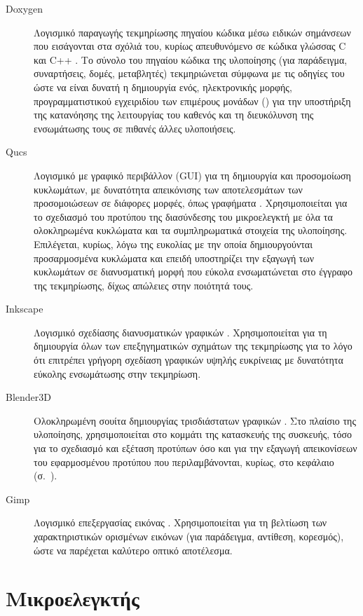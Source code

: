 \begin{description}
\item[Doxygen]
Λογισμικό παραγωγής τεκμηρίωσης πηγαίου κώδικα μέσω ειδικών σημάνσεων που
εισάγονται στα σχόλιά του, κυρίως απευθυνόμενο σε κώδικα γλώσσας C και C++
\parencite{doxygen}. Το σύνολο του πηγαίου κώδικα της υλοποίησης (για
παράδειγμα, συναρτήσεις, δομές, μεταβλητές) τεκμηριώνεται σύμφωνα με τις οδηγίες
του  ώστε να είναι δυνατή η δημιουργία ενός, ηλεκτρονικής μορφής,
προγραμματιστικού εγχειριδίου των επιμέρους μονάδων () για την
υποστήριξη της κατανόησης της λειτουργίας του καθενός και τη διευκόλυνση της
ενσωμάτωσης τους σε πιθανές άλλες υλοποιήσεις.

\item[Qucs]
Λογισμικό με γραφικό περιβάλλον (GUI) για τη δημιουργία και προσομοίωση
κυκλωμάτων, με δυνατότητα απεικόνισης των αποτελεσμάτων των προσομοιώσεων σε
διάφορες μορφές, όπως γραφήματα \parencite{qucs}.
Χρησιμοποιείται για το σχεδιασμό του προτύπου της διασύνδεσης του μικροελεγκτή
με όλα τα ολοκληρωμένα κυκλώματα και τα συμπληρωματικά στοιχεία της υλοποίησης.
Επιλέγεται, κυρίως, λόγω της ευκολίας με την οποία δημιουργούνται προσαρμοσμένα
κυκλώματα και επειδή υποστηρίζει την εξαγωγή των κυκλωμάτων σε διανυσματική
μορφή που εύκολα ενσωματώνεται στο έγγραφο της τεκμηρίωσης, δίχως απώλειες στην
ποιότητά τους.

\item[Inkscape]
Λογισμικό σχεδίασης διανυσματικών γραφικών \parencite{inkscape}. Χρησιμοποιείται
για τη δημιουργία όλων των επεξηγηματικών σχημάτων της τεκμηρίωσης για το λόγο
ότι επιτρέπει γρήγορη σχεδίαση γραφικών υψηλής ευκρίνειας με δυνατότητα εύκολης
ενσωμάτωσης στην τεκμηρίωση.

\item[Blender3D]
Ολοκληρωμένη σουίτα δημιουργίας τρισδιάστατων γραφικών \parencite{blender3d}.
Στο πλαίσιο της υλοποίησης, χρησιμοποιείται στο κομμάτι της κατασκευής της
συσκευής, τόσο για το σχεδιασμό και εξέταση προτύπων όσο και για την εξαγωγή
απεικονίσεων του εφαρμοσμένου προτύπου που περιλαμβάνονται, κυρίως, στο κεφάλαιο
 (σ.~\pageref{ch:construction}).

\item[Gimp]
Λογισμικό επεξεργασίας εικόνας \parencite{gimp}. Χρησιμοποιείται για τη βελτίωση
των χαρακτηριστικών ορισμένων εικόνων (για παράδειγμα, αντίθεση, κορεσμός), ώστε
να παρέχεται καλύτερο οπτικό αποτέλεσμα.
\end{description}


\section{Μικροελεγκτής}

